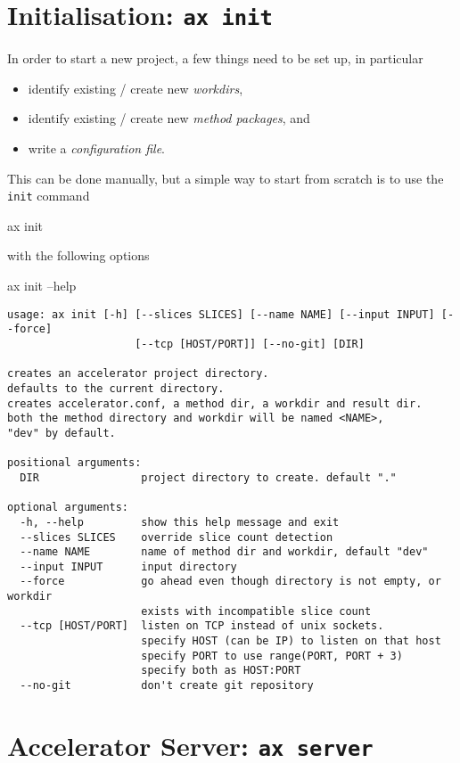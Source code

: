 \section{Initialisation: \texttt{ax init}}
\label{sec:initialisation}
In order to start a new project, a few things need to be set up, in
particular
\begin{itemize}
\item[] identify existing / create new \textsl{workdirs},
\item[] identify existing / create new \textsl{method packages}, and
\item[] write a \textsl{configuration file}.
\end{itemize}
This can be done manually, but a simple way to start from scratch is
to use the \texttt{init} command
\begin{shell}
ax init
\end{shell}
with the following options
\begin{shell}
ax init --help
\end{shell}
\begin{snugshade}
\begin{verbatim}
usage: ax init [-h] [--slices SLICES] [--name NAME] [--input INPUT] [--force]
                    [--tcp [HOST/PORT]] [--no-git] [DIR]

creates an accelerator project directory.
defaults to the current directory.
creates accelerator.conf, a method dir, a workdir and result dir.
both the method directory and workdir will be named <NAME>,
"dev" by default.

positional arguments:
  DIR                project directory to create. default "."

optional arguments:
  -h, --help         show this help message and exit
  --slices SLICES    override slice count detection
  --name NAME        name of method dir and workdir, default "dev"
  --input INPUT      input directory
  --force            go ahead even though directory is not empty, or workdir
                     exists with incompatible slice count
  --tcp [HOST/PORT]  listen on TCP instead of unix sockets.
                     specify HOST (can be IP) to listen on that host
                     specify PORT to use range(PORT, PORT + 3)
                     specify both as HOST:PORT
  --no-git           don't create git repository
\end{verbatim}
\end{snugshade}



\section{Accelerator Server: \texttt{ax server}}

